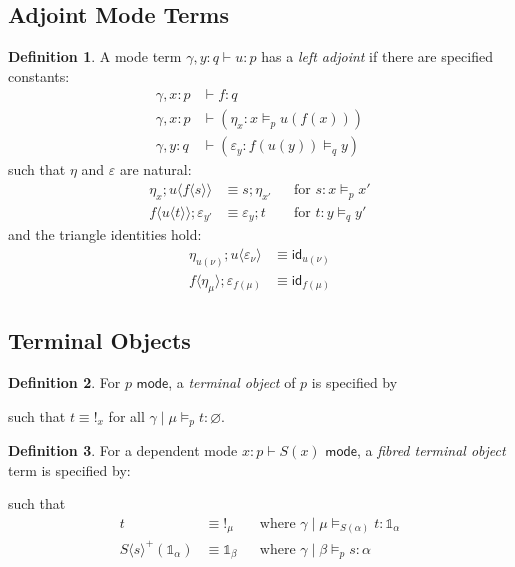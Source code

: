 \documentclass[10pt]{article}
\theoremstyle{definition}
\newtheorem{definition}{Definition}
\let\emptyset\varnothing
\newcommand{\yields}{\vdash}
\newcommand{\type}{\,\,\mathsf{mode}}
\newcommand{\id}{\mathsf{id}}
\newcommand\TermTwoT[5]{\ensuremath{#1 \mid #3 \vDash_{#5} {#2} : #4}}
\newcommand\TrPlus[2]{\ensuremath{{#1}^+(#2)}}
\newcommand\bang[0]{\mathord{!}}
\newcommand\ap[2]{\ensuremath{#1 \langle #2 \rangle }}
\begin{document}
\subsection{Adjoint Mode Terms}
\begin{definition}
A mode term $\gamma, y : q \yields u : p$ has a \emph{left adjoint} if there are specified constants:
\begin{align*}
\gamma, x : p &\yields f : q \\
\gamma, x : p &\yields (\eta_x : x \vDash_p u(f(x))) \\
\gamma, y : q &\yields (\varepsilon_y : f(u(y)) \vDash_q y)
\end{align*}
such that $\eta$ and $\varepsilon$ are natural:
\begin{align}
\eta_x ; \ap{u}{\ap{f}{s}} &\equiv s ; \eta_{x'} && \text{for } s : x \vDash_p	 x' \\
\ap{f}{\ap{u}{t}} ; \varepsilon_{y'}  &\equiv \varepsilon_y ; t && \text{for } t : y \vDash_q y'
\end{align}
and the triangle identities hold:
\begin{align}
\eta_{u(\nu)};\ap{u}{\varepsilon_\nu} &\equiv \id_{u(\nu)} \\
\ap{f}{\eta_\mu};\varepsilon_{f(\mu)} &\equiv \id_{f(\mu)}
\end{align}
\end{definition}

\subsection{Terminal Objects}
\newcommand\One{\ensuremath{\mathds{1}}}

\begin{definition}
For $p \type$, a \emph{terminal object} of $p$ is specified by
such that $t \equiv \bang_x$ for all $\TermTwoT{\gamma}{t}{\mu}{\emptyset}{p}$.
\end{definition}

\begin{definition}
For a dependent mode $x : p \vdash S(x) \type$, a \emph{fibred terminal object} term is specified by:
such that
\begin{align}
\label{bang-unique}
t & \equiv \bang_\mu && \text{where } \TermTwoT{\gamma}{t}{\mu}{\One_\alpha}{S(\alpha)}\\
\label{s-plus-one-strict}
\TrPlus{\ap{S}{s}}{\One_\alpha} &\equiv \One_\beta && \text{where } \TermTwoT{\gamma}{s}{\beta}{\alpha}{p}
\end{align}
\end{definition}
\end{document}
